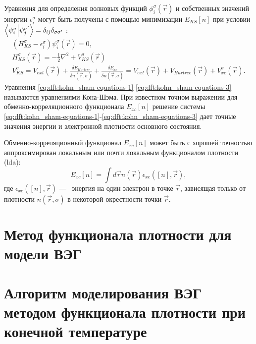 Уравнения для определения волновых функций $\phi_i^\sigma (\vec{r})$ и собственных значений энергии $\epsilon_i^\sigma$ могут быть получены с помощью минимизации $E_{KS} [n]$ при условии $\bra{\psi_i^\sigma} \ket{\psi_j^{\sigma'}} = \delta_{ij} \delta_{\sigma \sigma'}$ \cite{kohn-sham:dft-kinetic-approximation}:
\begin{gather}
    \label{eq:dft:kohn_sham-equations-1}
    (H_{KS}^\sigma - \epsilon_i^\sigma) \psi_i^\sigma (\vec{r}) = 0, \\
    \label{eq:dft:kohn_sham-equations-2}
    H_{KS}^\sigma (\vec{r}) = - \frac{1}{2} \nabla^2 + V_{KS}^\sigma (\vec{r}) \\
    \label{eq:dft:kohn_sham-equations-3}
    V_{KS}^\sigma = V_{ext} (\vec{r}) + \frac{\delta E_{Hartree}}{\delta n(\vec{r}, \sigma)} + \frac{\delta E_{xc}}{\delta n(\vec{r}, \sigma)}
    = V_{ext} (\vec{r}) + V_{Hartree} (\vec{r}) + V_{xc}^\sigma (\vec{r}).
\end{gather}
Уравнения \eqref{eq:dft:kohn_sham-equations-1}-\eqref{eq:dft:kohn_sham-equations-3} называются уравнениями Кона-Шэма.
При известном точном выражении для обменно-корреляционного функционала $E_{xc} [n]$
решение системы \eqref{eq:dft:kohn_sham-equations-1}-\eqref{eq:dft:kohn_sham-equations-3} дает точные значения энергии и электронной плотности основного состояния.

Обменно-корреляционный функционал $E_{xc} [n]$ может быть с хорошей точностью аппроксимирован локальным или почти локальным функционалом плотности (\acrshort{lda}):
\begin{equation}
    \label{eq:dft:E_xc-LDA}
    E_{xc} [n] = \int d\vec{r} n(\vec{r}) \epsilon_{xc} ([n], \vec{r}),
\end{equation}
где $\epsilon_{xc} ([n], \vec{r})$ ---~ энергия на один электрон в точке $\vec{r}$, зависящая только от плотности $n(\vec{r}, \sigma)$ в некоторой окрестности точки $\vec{r}$.


\section{Метод функционала плотности для модели ВЭГ}

\section{Алгоритм моделирования ВЭГ методом функционала плотности при конечной температуре}
